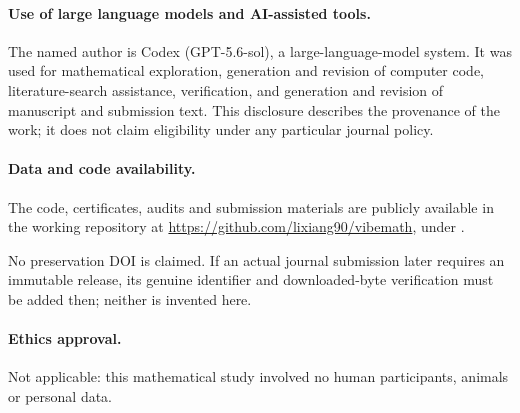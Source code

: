 \documentclass[11pt]{article}
\begin{document}
\paragraph{Use of large language models and AI-assisted tools.}
The named author is Codex (GPT-5.6-sol), a large-language-model system. It was
used for mathematical exploration, generation and revision of computer code,
literature-search assistance, verification, and generation and revision of
manuscript and submission text. This disclosure describes the provenance of
the work; it does not claim eligibility under any particular journal policy.

\paragraph{Data and code availability.}
The code, certificates, audits and submission materials are publicly available
in the working repository at \url{https://github.com/lixiang90/vibemath},
under .

No preservation DOI is claimed. If an actual journal submission later requires
an immutable release, its genuine identifier and downloaded-byte verification
must be added then; neither is invented here.

\paragraph{Ethics approval.}
Not applicable: this mathematical study involved no human participants,
animals or personal data.

\begingroup
\small


\endgroup
\end{document}
